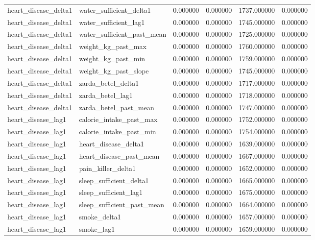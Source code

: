 \begin{longtable}{llrrrr}
heart\_disease\_delta1 & water\_sufficient\_delta1 & 0.000000 & 0.000000 & 1737.000000 & 0.000000 \\
heart\_disease\_delta1 & water\_sufficient\_lag1 & 0.000000 & 0.000000 & 1745.000000 & 0.000000 \\
heart\_disease\_delta1 & water\_sufficient\_past\_mean & 0.000000 & 0.000000 & 1725.000000 & 0.000000 \\
heart\_disease\_delta1 & weight\_kg\_past\_max & 0.000000 & 0.000000 & 1760.000000 & 0.000000 \\
heart\_disease\_delta1 & weight\_kg\_past\_min & 0.000000 & 0.000000 & 1759.000000 & 0.000000 \\
heart\_disease\_delta1 & weight\_kg\_past\_slope & 0.000000 & 0.000000 & 1745.000000 & 0.000000 \\
heart\_disease\_delta1 & zarda\_betel\_delta1 & 0.000000 & 0.000000 & 1717.000000 & 0.000000 \\
heart\_disease\_delta1 & zarda\_betel\_lag1 & 0.000000 & 0.000000 & 1718.000000 & 0.000000 \\
heart\_disease\_delta1 & zarda\_betel\_past\_mean & 0.000000 & 0.000000 & 1747.000000 & 0.000000 \\
heart\_disease\_lag1 & calorie\_intake\_past\_max & 0.000000 & 0.000000 & 1752.000000 & 0.000000 \\
heart\_disease\_lag1 & calorie\_intake\_past\_min & 0.000000 & 0.000000 & 1754.000000 & 0.000000 \\
heart\_disease\_lag1 & heart\_disease\_delta1 & 0.000000 & 0.000000 & 1639.000000 & 0.000000 \\
heart\_disease\_lag1 & heart\_disease\_past\_mean & 0.000000 & 0.000000 & 1667.000000 & 0.000000 \\
heart\_disease\_lag1 & pain\_killer\_delta1 & 0.000000 & 0.000000 & 1652.000000 & 0.000000 \\
heart\_disease\_lag1 & sleep\_sufficient\_delta1 & 0.000000 & 0.000000 & 1665.000000 & 0.000000 \\
heart\_disease\_lag1 & sleep\_sufficient\_lag1 & 0.000000 & 0.000000 & 1675.000000 & 0.000000 \\
heart\_disease\_lag1 & sleep\_sufficient\_past\_mean & 0.000000 & 0.000000 & 1664.000000 & 0.000000 \\
heart\_disease\_lag1 & smoke\_delta1 & 0.000000 & 0.000000 & 1657.000000 & 0.000000 \\
heart\_disease\_lag1 & smoke\_lag1 & 0.000000 & 0.000000 & 1659.000000 & 0.000000 \\

\end{longtable}

